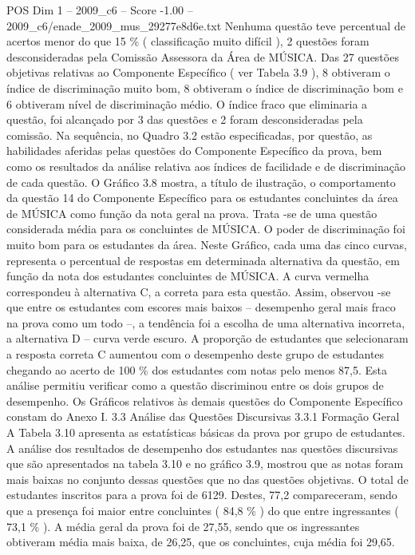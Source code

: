 \begin{textsample}{POS Dim 1 – 2009\_c6 – Score -1.00 – 2009\_c6/enade\_2009\_mus\_29277e8d6e.txt}
Nenhuma questão teve percentual de acertos menor do que 15 \% ( classificação muito difícil ), 2 questões foram desconsideradas pela Comissão Assessora da Área de MÚSICA.
Das 27 questões objetivas relativas ao Componente Específico ( ver Tabela 3.9 ), 8 obtiveram o índice de discriminação muito bom, 8 obtiveram o índice de discriminação bom e 6 obtiveram nível de discriminação médio.
O índice fraco que eliminaria a questão, foi alcançado por 3 das questões e 2 foram desconsideradas pela comissão.
Na sequência, no Quadro 3.2 estão especificadas, por questão, as habilidades aferidas pelas questões do Componente Específico da prova, bem como os resultados da análise relativa aos índices de facilidade e de discriminação de cada questão.
O Gráfico 3.8 mostra, a título de ilustração, o comportamento da questão 14 do Componente Específico para os estudantes concluintes da área de MÚSICA como função da nota geral na prova.
Trata -se de uma questão considerada média para os concluintes de MÚSICA.
O poder de discriminação foi muito bom para os estudantes da área.
Neste Gráfico, cada uma das cinco curvas, representa o percentual de respostas em determinada alternativa da questão, em função da nota dos estudantes concluintes de MÚSICA.
A curva vermelha correspondeu à alternativa C, a correta para esta questão.
Assim, observou -se que entre os estudantes com escores mais baixos – desempenho geral mais fraco na prova como um todo –, a tendência foi a escolha de uma alternativa incorreta, a alternativa D – curva verde escuro.
A proporção de estudantes que selecionaram a resposta correta C aumentou com o desempenho deste grupo de estudantes chegando ao acerto de 100 \% dos estudantes com notas pelo menos 87,5.
Esta análise permitiu verificar como a questão discriminou entre os dois grupos de desempenho.
Os Gráficos relativos às demais questões do Componente Específico constam do Anexo I. 3.3 Análise das Questões Discursivas 3.3.1 Formação Geral A Tabela 3.10 apresenta as estatísticas básicas da prova por grupo de estudantes.
A análise dos resultados de desempenho dos estudantes nas questões discursivas que são apresentados na tabela 3.10 e no gráfico 3.9, mostrou que as notas foram mais baixas no conjunto dessas questões que no das questões objetivas.
O total de estudantes inscritos para a prova foi de 6129.
Destes, 77,2 compareceram, sendo que a presença foi maior entre concluintes ( 84,8 \% ) do que entre ingressantes ( 73,1 \% ).
A média geral da prova foi de 27,55, sendo que os ingressantes obtiveram média mais baixa, de 26,25, que os concluintes, cuja média foi 29,65.

\end{textsample}
